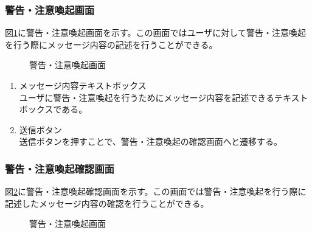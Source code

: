 \documentclass[a4j]{jarticle}
\begin{document}
\subsubsection{警告・注意喚起画面}
図\ref{fig:warning}に警告・注意喚起画面を示す。この画面ではユーザに対して警告・注意喚起を行う際にメッセージ内容の記述を行うことができる。

\begin{figure}[H]
\centering
{}
\caption{警告・注意喚起画面}
\label{fig:warning}
\end{figure}

\begin{enumerate}
  \renewcommand{\labelenumi}{\textcircled{\scriptsize \theenumi}}

\item メッセージ内容テキストボックス\\
ユーザに警告・注意喚起を行うためにメッセージ内容を記述できるテキストボックスである。
\item 送信ボタン\\
送信ボタンを押すことで、警告・注意喚起の確認画面へと遷移する。
\end{enumerate}

\subsubsection{警告・注意喚起確認画面}
図\ref{fig:warning_confirm}に警告・注意喚起確認画面を示す。この画面では警告・注意喚起を行う際に記述したメッセージ内容の確認を行うことができる。
\begin{figure}[H]
\centering
{}
\caption{警告・注意喚起画面}
\label{fig:warning_confirm}
\end{figure}
\end{document}
